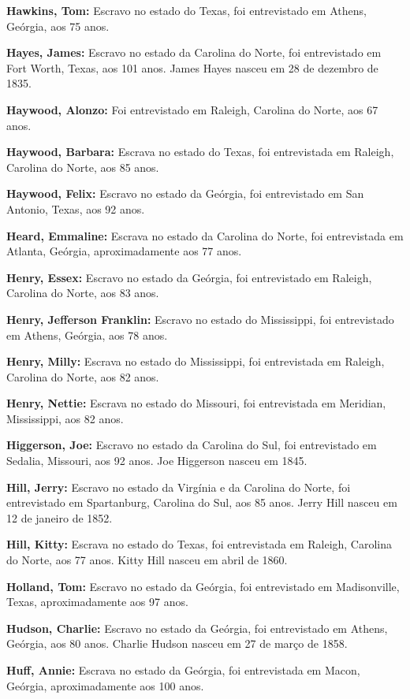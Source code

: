 \textbf{Hawkins, Tom:} Escravo no estado do Texas, foi entrevistado em
Athens, Geórgia, aos 75 anos.

\textbf{Hayes, James:} Escravo no estado da Carolina do Norte, foi
entrevistado em Fort Worth, Texas, aos 101 anos. James Hayes nasceu em
28 de dezembro de 1835.

\textbf{Haywood, Alonzo:} Foi entrevistado em Raleigh, Carolina do
Norte, aos 67 anos.

\textbf{Haywood, Barbara:} Escrava no estado do Texas, foi entrevistada
em Raleigh, Carolina do Norte, aos 85 anos.

\textbf{Haywood, Felix:} Escravo no estado da Geórgia, foi entrevistado
em San Antonio, Texas, aos 92 anos.

\textbf{Heard, Emmaline:} Escrava no estado da Carolina do Norte, foi
entrevistada em Atlanta, Geórgia, aproximadamente aos 77 anos.

\textbf{Henry, Essex:} Escravo no estado da Geórgia, foi entrevistado em
Raleigh, Carolina do Norte, aos 83 anos.

\textbf{Henry, Jefferson Franklin:} Escravo no estado do Mississippi,
foi entrevistado em Athens, Geórgia, aos 78 anos.

\textbf{Henry, Milly:} Escrava no estado do Mississippi, foi
entrevistada em Raleigh, Carolina do Norte, aos 82 anos.

\textbf{Henry, Nettie:} Escrava no estado do Missouri, foi entrevistada
em Meridian, Mississippi, aos 82 anos.

\textbf{Higgerson, Joe:} Escravo no estado da Carolina do Sul, foi
entrevistado em Sedalia, Missouri, aos 92 anos. Joe Higgerson nasceu em
1845.

\textbf{Hill, Jerry:} Escravo no estado da Virgínia e da Carolina do
Norte, foi entrevistado em Spartanburg, Carolina do Sul, aos 85 anos.
Jerry Hill nasceu em 12 de janeiro de 1852.

\textbf{Hill, Kitty:} Escrava no estado do Texas, foi entrevistada em
Raleigh, Carolina do Norte, aos 77 anos. Kitty Hill nasceu em abril de
1860.

\textbf{Holland, Tom:} Escravo no estado da Geórgia, foi entrevistado em
Madisonville, Texas, aproximadamente aos 97 anos.

\textbf{Hudson, Charlie:} Escravo no estado da Geórgia, foi entrevistado
em Athens, Geórgia, aos 80 anos. Charlie Hudson nasceu em 27 de março de
1858.

\textbf{Huff, Annie:} Escrava no estado da Geórgia, foi entrevistada em
Macon, Geórgia, aproximadamente aos 100 anos.

